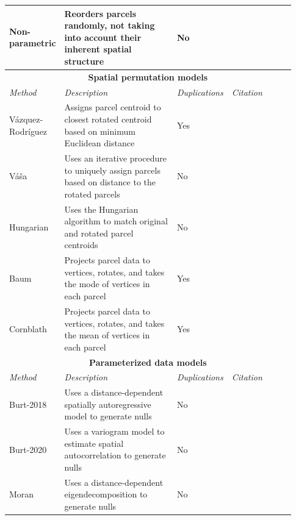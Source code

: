 \documentclass[12pt,aps,pra,reprint,showkeys]{revtex4-1}
\begin{document}
\begin{table}[htp]
\begin{center}
\begin{tabular}{p{0.15\linewidth} p{0.43\linewidth} p{0.10\linewidth} p{0.25\linewidth}}
        Non-parametric  & Reorders parcels randomly, not taking into account their inherent spatial structure               & No  &                                   \\ \toprule
        \multicolumn{4}{c}{\textbf{Spatial permutation models}}                                                                                                       \\ \toprule
        \emph{Method}   & \emph{Description}                                                                                & \emph{Duplications} & \emph{Citation}   \\ \midrule
        V{\'a}zquez-Rodr{\'i}guez & Assigns parcel centroid to closest rotated centroid based on minimum Euclidean distance & Yes & \citet{vazquezrodriguez2019pnas}  \\
        V{\'a}{\v{s}}a  & Uses an iterative procedure to uniquely assign parcels based on distance to the rotated parcels   & No  & \citet{vasa2018cercor}            \\
        Hungarian       & Uses the Hungarian algorithm to match original and rotated parcel centroids                       & No  &                                   \\
        Baum            & Projects parcel data to vertices, rotates, and takes the mode of vertices in each parcel          & Yes & \citet{baum2020pnas}              \\
        Cornblath       & Projects parcel data to vertices, rotates, and takes the mean of vertices in each parcel          & Yes & \citet{cornblath2019arxiv}        \\ \toprule
        \multicolumn{4}{c}{\textbf{Parameterized data models}}                                                                                                        \\ \toprule
        \emph{Method}   & \emph{Description}                                                                                & \emph{Duplications} & \emph{Citation}   \\ \midrule
        Burt-2018      & Uses a distance-dependent spatially autoregressive model to generate nulls                         & No  & \citet{burt2018natneuro}          \\
        Burt-2020      & Uses a variogram model to estimate spatial autocorrelation to generate nulls                       & No  & \cite{burt2020neuroimage}         \\
        Moran           & Uses a distance-dependent eigendecomposition to generate nulls                                    & No  & \citet{vosdewael2020brainspace}   \\
      \end{tabular}
    \end{center}
\end{table}
\end{document}
